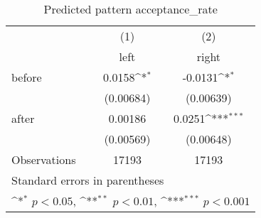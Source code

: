 \begin{table}[htbp]\centering
\def\sym#1{\ifmmode^{#1}\else\(^{#1}\)\fi}
\caption{Predicted pattern acceptance\_rate}
\begin{tabular}{l*{2}{c}}
\hline\hline
                    &\multicolumn{1}{c}{(1)}&\multicolumn{1}{c}{(2)}\\
                    &\multicolumn{1}{c}{left}&\multicolumn{1}{c}{right}\\
\hline
before              &      0.0158\sym{*}  &     -0.0131\sym{*}  \\
                    &   (0.00684)         &   (0.00639)         \\
[1em]
after               &     0.00186         &      0.0251\sym{***}\\
                    &   (0.00569)         &   (0.00648)         \\
\hline
Observations        &       17193         &       17193         \\
\hline\hline
\multicolumn{3}{l}{\footnotesize Standard errors in parentheses}\\
\multicolumn{3}{l}{\footnotesize \sym{*} \(p<0.05\), \sym{**} \(p<0.01\), \sym{***} \(p<0.001\)}\\
\end{tabular}
\end{table}
